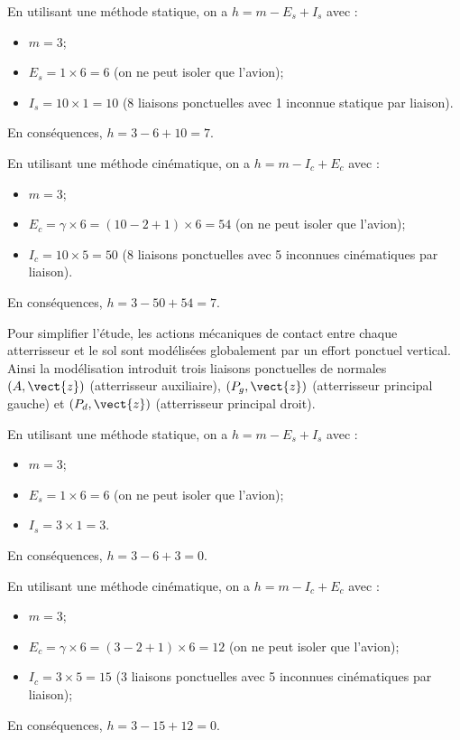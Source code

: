En utilisant une méthode statique, on a $h=m-E_s+I_s$ avec : 
\begin{itemize}
\item  $m=3$;
\item $E_s = 1\times 6 = 6$ (on ne peut isoler que l'avion);
\item $I_s = 10 \times 1 = 10$ (8 liaisons ponctuelles avec 1 inconnue statique par liaison).
\end{itemize}
En conséquences, $h = 3-6+10 =7$. 

En utilisant une méthode cinématique, on a $h=m-I_c+E_c$ avec : 
\begin{itemize}
\item  $m=3$;
\item $E_c = \gamma \times 6 = (10-2+1) \times 6 = 54$ (on ne peut isoler que l'avion);
\item $I_c = 10 \times 5 = 50$ (8 liaisons ponctuelles avec 5 inconnues cinématiques par liaison).
\end{itemize}
En conséquences, $h = 3-50+54 =7$. 

\else 
\fi

Pour simplifier l’étude, les actions mécaniques de contact entre chaque atterrisseur et
le sol sont modélisées globalement par un effort ponctuel vertical. Ainsi la modélisation
introduit trois liaisons ponctuelles de normales $(A, \vect{z})$ (atterrisseur
auxiliaire), $(P_g, \vect{z})$ (atterrisseur principal gauche) et $(P_d, \vect{z})$ (atterrisseur principal droit).

\ifprof

En utilisant une méthode statique, on a $h=m-E_s+I_s$ avec : 
\begin{itemize}
\item  $m=3$;
\item $E_s = 1\times 6 = 6$ (on ne peut isoler que l'avion);
\item $I_s = 3 \times 1 = 3$.
\end{itemize}
En conséquences, $h = 3-6+3 =0$. 

En utilisant une méthode cinématique, on a $h=m-I_c+E_c$ avec : 
\begin{itemize}
\item  $m=3$;
\item $E_c = \gamma \times 6 = (3-2+1) \times 6 = 12$ (on ne peut isoler que l'avion);
\item $I_c = 3 \times 5 = 15$ (3 liaisons ponctuelles avec 5 inconnues cinématiques par liaison);
\end{itemize}
En conséquences, $h = 3-15+12 =0$. 

\else 
\fi
 
 

\ifprof
\else
{}
\fi